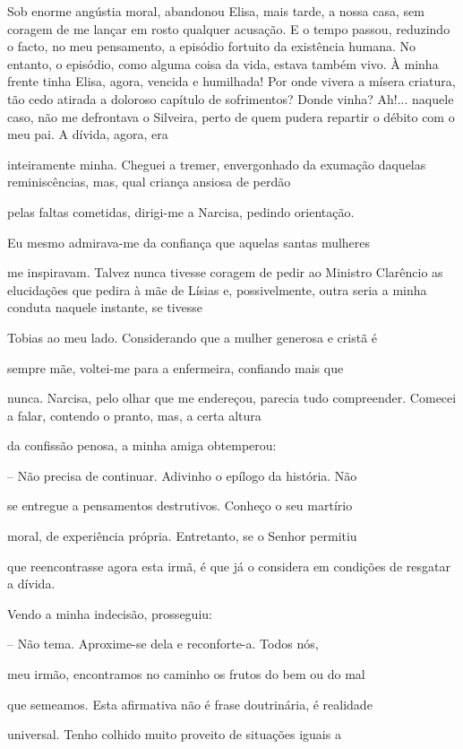 \documentclass[portuguese,12pt,a4paper]{scrbook}
\begin{document}
	Sob enorme angústia moral, abandonou Elisa, mais tarde, a nossa casa, sem coragem de me lançar em rosto qualquer acusação. E o tempo passou, reduzindo o facto, no meu pensamento, a episódio fortuito da existência humana. No entanto, o episódio, como alguma coisa da vida, estava também vivo. À minha frente tinha Elisa, agora, vencida e humilhada! Por onde vivera a mísera criatura, tão cedo atirada a doloroso capítulo de sofrimentos? Donde vinha? Ah!... naquele caso, não me defrontava o Silveira, perto de quem pudera repartir o débito com o meu pai. A dívida, agora, era
	
	
	inteiramente minha. Cheguei a tremer, envergonhado da exumação daquelas reminiscências, mas, qual criança ansiosa de perdão
	
	pelas faltas cometidas, dirigi-me a Narcisa, pedindo orientação.
	
	Eu mesmo admirava-me da confiança que aquelas santas mulheres
	
	me inspiravam. Talvez nunca tivesse coragem de pedir ao Ministro Clarêncio as elucidações que pedira à mãe de Lísias e, possivelmente, outra seria a minha conduta naquele instante, se tivesse
	
	Tobias ao meu lado. Considerando que a mulher generosa e cristã é
	
	sempre mãe, voltei-me para a enfermeira, confiando mais que
	
	nunca. Narcisa, pelo olhar que me endereçou, parecia tudo compreender. Comecei a falar, contendo o pranto, mas, a certa altura
	
	da confissão penosa, a minha amiga obtemperou:
	
	– Não precisa de continuar. Adivinho o epílogo da história. Não
	
	se entregue a pensamentos destrutivos. Conheço o seu martírio
	
	moral, de experiência própria. Entretanto, se o Senhor permitiu
	
	que reencontrasse agora esta irmã, é que já o considera em condições de resgatar a dívida.
	
	Vendo a minha indecisão, prosseguiu:
	
	– Não tema. Aproxime-se dela e reconforte-a. Todos nós,
	
	meu irmão, encontramos no caminho os frutos do bem ou do mal
	
	que semeamos. Esta afirmativa não é frase doutrinária, é realidade
	
	universal. Tenho colhido muito proveito de situações iguais a
	
\end{document}
